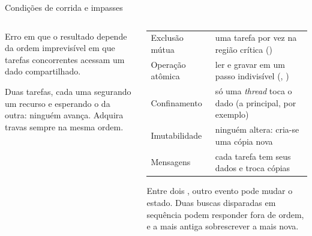 \begin{frame}{Condições de corrida e impasses}
  \begin{columns}[T]
    \begin{column}{0.47\textwidth}
      \centering
      \begin{definicao}
        Erro em que o resultado depende da ordem imprevisível em que tarefas concorrentes acessam um dado compartilhado.
      \end{definicao}
      \begin{atencao}
        Duas tarefas, cada uma segurando um recurso e esperando o da outra: ninguém avança. Adquira travas sempre na mesma ordem.
      \end{atencao}
    \end{column}
    \begin{column}{0.51\textwidth}
      \scriptsize
      \begin{tabularx}{\linewidth}{@{}l L@{}}
        \toprule
         &  \\
        \midrule
        Exclusão mútua & uma tarefa por vez na região crítica () \\
        Operação atômica & ler e gravar em um passo indivisível (, ) \\
        Confinamento & só uma \emph{thread} toca o dado (a principal, por exemplo) \\
        Imutabilidade & ninguém altera: cria-se uma cópia nova \\
        Mensagens & cada tarefa tem seus dados e troca cópias \\
        \bottomrule
      \end{tabularx}
      \normalsize
      \begin{pordentro}
        Entre dois , outro evento pode mudar o estado. Duas buscas disparadas em sequência podem responder fora de ordem, e a mais antiga sobrescrever a mais nova.
      \end{pordentro}
    \end{column}
  \end{columns}
\end{frame}

